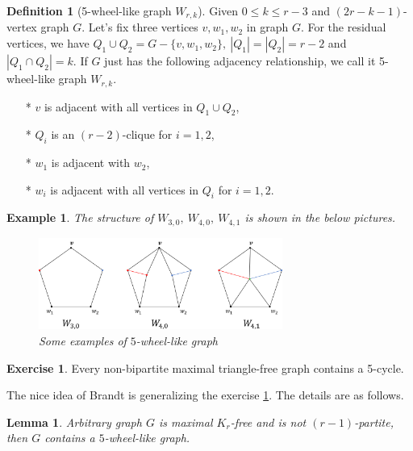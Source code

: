 \documentclass{article}
\newtheorem{lemma}[theorem]{Lemma}
\newtheorem{example}[theorem]{Example}
\theoremstyle{definition}
\newtheorem{definition}[theorem]{Definition}
\newtheorem{exercise}[theorem]{Exercise}
\begin{document}
\begin{definition}[5-wheel-like graph $W_{r,k}$]
Given $0\le k \le r-3$ and $(2r-k-1)$-vertex graph $G$. Let's fix three vertices $v,w_1,w_2$ in graph $G$. For the residual vertices, we have $Q_1 \cup Q_2 = G-\{v,w_1,w_2\},~|Q_1|=|Q_2|=r-2$ and $|Q_1\cap Q_2|=k$. If $G$ just has the following adjacency relationship, we call it 5-wheel-like graph $W_{r,k}$.
\begin{itemize}
    \item[*] $v$ is adjacent with all vertices in $Q_1 \cup Q_2$,
    \item[*] $Q_i$ is an $(r-2)$-clique for $i=1,2$,
    \item[*] $w_1$ is adjacent with $w_2$,
    \item[*] $w_i$ is adjacent with all vertices in $Q_i$ for $i=1,2$.
\end{itemize}

\end{definition}
\begin{example}
The structure of $W_{3,0},~W_{4,0},~W_{4,1}$ is shown in the below pictures.
    \begin{figure}[htbp]
        \centering
        \includegraphics[width=8cm]{7-2.png}
        \caption{Some examples of $5$-wheel-like graph}
        \label{fig:7-2}
    \end{figure}
\end{example}

\begin{exercise}\label{IdeaOrigin}
Every non-bipartite maximal triangle-free graph contains a 5-cycle.
\end{exercise}

The nice idea of Brandt is generalizing the exercise \ref{IdeaOrigin}. The details are as follows.

\begin{lemma}\label{BrandtIdea}
    Arbitrary graph $G$ is maximal $K_r$-free and is not $(r-1)$-partite, then $G$ contains a $5$-wheel-like graph.
\end{lemma}
\end{document}

